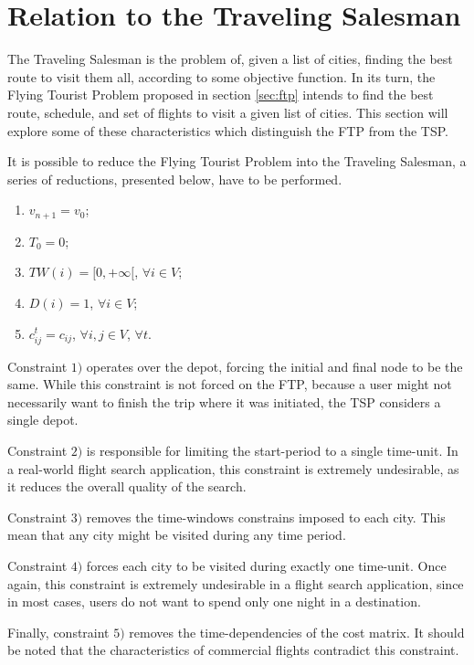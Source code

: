\section{Relation to the Traveling Salesman}
\label{sec:ftp_tsp}

The Traveling Salesman is the problem of, given a list of cities, finding the best route to visit them all, according to some objective function. In its turn, the Flying Tourist Problem proposed in section \ref{sec:ftp} intends to find the best route, schedule, and set of flights to visit a given list of cities. This section will explore some of these characteristics which distinguish the FTP from the TSP.

It is possible to reduce the Flying Tourist Problem into the Traveling Salesman, a series of reductions, presented below, have to be performed. 

\begin{enumerate}
      \item $v_{n+1} = v_0$;
      \item $T_0 = 0$;
      \item $TW(i) = [0, +\infty[$, $\forall i \in V$;
      \item $D(i) = 1$, $\forall i \in V$;
    \item $c_{ij}^{t} = c_{ij}$, $\forall i, j \in V$, $\forall t$.
\end{enumerate}

Constraint $1)$ operates over the depot, forcing the initial and final node to be the same. While this constraint is not forced on the FTP, because a user might not necessarily want to finish the trip where it was initiated, the TSP considers a single depot. 

Constraint $2)$ is responsible for limiting the start-period to a single time-unit. In a real-world flight search application, this constraint is extremely undesirable, as it reduces the overall quality of the search.

Constraint $3)$ removes the time-windows constrains imposed to each city. This mean that any city might be visited during any time period.

Constraint $4)$ forces each city to be visited during exactly one time-unit. Once again, this constraint is extremely undesirable in a flight search application, since in most cases, users do not want to spend only one night in a destination.

Finally, constraint $5)$ removes the time-dependencies of the cost matrix. It should be noted that the characteristics of commercial flights contradict this constraint.

